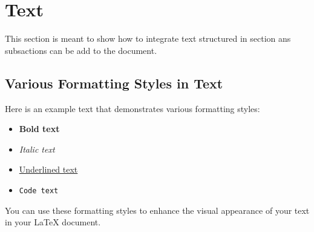 \section{Text}\label{sec:text}
This section is meant to show how to integrate text structured in section ans subsactions can be add to the document.

\subsection{Various Formatting Styles in Text}\label{subsec:formatting_styles_text}
Here is an example text that demonstrates various formatting styles:

\begin{itemize}
    \item \textbf{Bold text}
    \item \textit{Italic text}
    \item \underline{Underlined text}
    \item \texttt{Code text}
\end{itemize}

You can use these formatting styles to enhance the visual appearance of your text in your LaTeX document.
